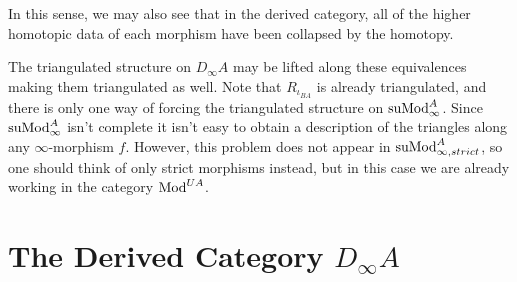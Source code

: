 \documentclass[../thesis.tex]{subfiles}
\begin{document}
            In this sense, we may also see that in the derived category, all of the higher homotopic data of each morphism have been collapsed by the homotopy.

            The triangulated structure on $D_\infty A$ may be lifted along these equivalences making them triangulated as well. Note that $R_{\iota_{BA}}$ is already triangulated, and there is only one way of forcing the triangulated structure on $\tt{suMod}_\infty^A$. Since $\tt{suMod}_{\infty}^A$ isn't complete it isn't easy to obtain a description of the triangles along any $\infty$-morphism $f$. However, this problem does not appear in $\tt{suMod}_{\infty, strict}^A$, so one should think of only strict morphisms instead, but in this case we are already working in the category $\tt{Mod}^{UA}$. 
    \section{The Derived Category $D_\infty A$}
\end{document}
